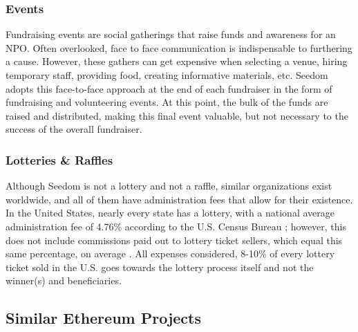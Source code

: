 \documentclass[11pt]{article}
\begin{document}
\subsubsection{Events}

Fundraising events are social gatherings that raise funds and awareness for an NPO. Often overlooked, face to face communication is indispensable to furthering a cause. However, these gathers can get expensive when selecting a venue, hiring temporary staff, providing food, creating informative materials, etc. Seedom adopts this face-to-face approach at the end of each fundraiser in the form of fundraising and volunteering events. At this point, the bulk of the funds are raised and distributed, making this final event valuable, but not necessary to the success of the overall fundraiser.

\subsubsection{Lotteries \& Raffles}

Although Seedom is not a lottery and not a raffle, similar organizations exist worldwide, and all of them have administration fees that allow for their existence. In the United States, nearly every state has a lottery, with a national average administration fee of 4.76\% according to the U.S. Census Bureau \cite{3}; however, this does not include commissions paid out to lottery ticket sellers, which equal this same percentage, on average \cite{4}. All expenses considered, 8-10\% of every lottery ticket sold in the U.S. goes towards the lottery process itself and not the winner(s) and beneficiaries.

\subsection{Similar Ethereum Projects}
\end{document}
